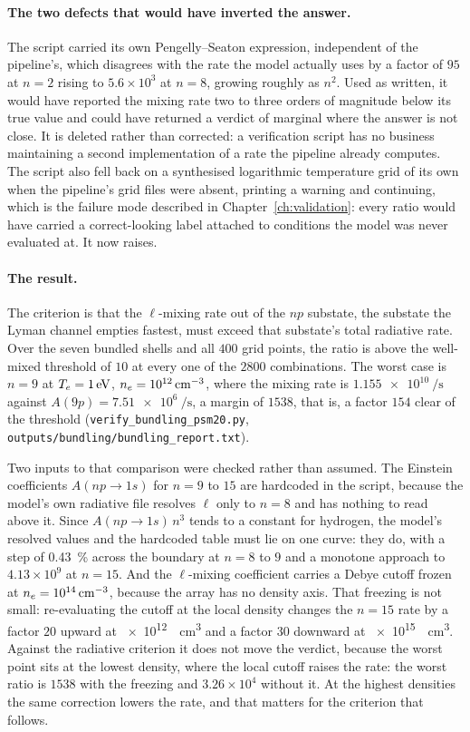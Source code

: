 \paragraph{The two defects that would have inverted the answer.} The script
carried its own Pengelly--Seaton expression, independent of the pipeline's,
which disagrees with the rate the model actually uses by a factor of $95$ at
$n = 2$ rising to $5.6\times10^{3}$ at $n = 8$, growing roughly as $n^{2}$. Used
as written, it would have reported the mixing rate two to three orders of
magnitude below its true value and could have returned a verdict of marginal
where the answer is not close. It is deleted rather than corrected: a
verification script has no business maintaining a second implementation of a
rate the pipeline already computes. The script also fell back on a synthesised
logarithmic temperature grid of its own when the pipeline's grid files were
absent,
printing a warning and continuing, which is the failure mode described in
Chapter~\ref{ch:validation}: every ratio would have carried a correct-looking
label attached to conditions the model was never evaluated at. It now raises.

\paragraph{The result.} The criterion is that the $\ell$-mixing rate out of the
$np$ substate, the substate the Lyman channel empties fastest, must exceed that
substate's total radiative rate. Over the seven bundled shells and all $400$
grid points, the ratio is above the well-mixed threshold of $10$ at every one of
the $2800$ combinations. The worst case is $n = 9$ at
$T_e = \SI{1}{\electronvolt}$, $n_e = \SI{e12}{\per\cubic\centi\metre}$, where
the mixing rate is $\SI{1.155e10}{\per\second}$ against
$A(9p) = \SI{7.51e6}{\per\second}$, a margin of $1538$, that is, a factor $154$
clear of the threshold (\texttt{verify\_bundling\_psm20.py},
\texttt{outputs/bundling/bundling\_report.txt}).

Two inputs to that comparison were checked rather than assumed. The Einstein
coefficients $A(np\to1s)$ for $n = 9$ to $15$ are hardcoded in the script,
because the model's own radiative file resolves $\ell$ only to $n = 8$ and has
nothing to read above it. Since $A(np\to1s)\,n^{3}$ tends to a constant for
hydrogen, the model's resolved values and the hardcoded table must lie on one
curve: they do, with a step of \SI{0.43}{\percent} across the boundary at
$n = 8$ to $9$ and a monotone approach to $4.13\times10^{9}$ at $n = 15$. And
the $\ell$-mixing coefficient carries a Debye cutoff frozen at
$n_e = \SI{e14}{\per\cubic\centi\metre}$, because the array has no density
axis. That freezing is not small: re-evaluating the cutoff at the local density
changes the $n = 15$ rate by a factor $20$ upward at
\SI{e12}{\per\cubic\centi\metre} and a factor $30$ downward at
\SI{e15}{\per\cubic\centi\metre}. Against the radiative criterion it does not
move the verdict, because the worst point sits at the lowest density, where the
local cutoff raises the rate: the worst ratio is $1538$ with the freezing and
$3.26\times10^{4}$ without it. At the highest densities the same correction
lowers the rate, and that matters for the criterion that follows.

